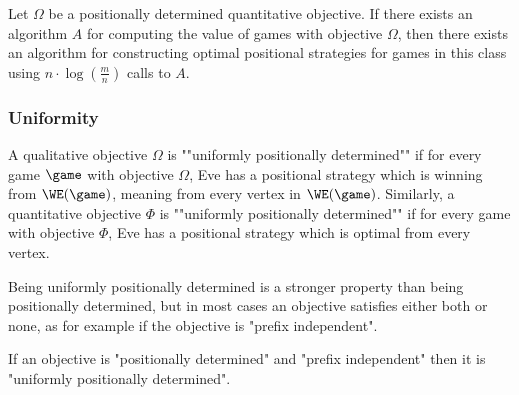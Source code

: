 \begin{lemma}
\label{1-lem:constructing_winning_strategy_quantitative}
Let $\Omega$ be a positionally determined quantitative objective.
If there exists an algorithm $A$ for computing the value of games with objective $\Omega$,
then there exists an algorithm for constructing optimal positional strategies for games in this class 
using $n \cdot \log(\frac{m}{n})$ calls to $A$.
\end{lemma}

\subsubsection*{Uniformity}
A qualitative objective $\Omega$ is ""uniformly positionally determined"" if for every game $\game$ with objective $\Omega$, 
Eve has a positional strategy which is winning from $\WE(\game)$, meaning from every vertex in $\WE(\game)$.
Similarly, a quantitative objective $\Phi$ is ""uniformly positionally determined"" if for every game with objective $\Phi$, 
Eve has a positional strategy which is optimal from every vertex.

Being uniformly positionally determined is a stronger property than being positionally determined, but in most cases an objective satisfies either both or none, as for example if the objective is "prefix independent".

\begin{lemma}\label{1-lem:from_positional_to_uniformly_positional}
If an objective is "positionally determined" and "prefix independent" then it is "uniformly positionally determined".
\end{lemma}

